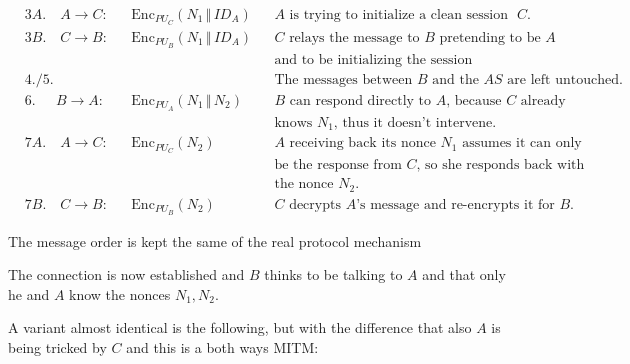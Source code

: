 \documentclass[oneside]{academica}
\begin{document}
\hspace{0.05\textwidth}
\begin{minipage}{0.95\textwidth}
  \vspace{-5pt}
  \begin{align*}
    & 3A. \quad A \rightarrow C: & & \text{Enc}_{PU_C} \left( N_1 \,\Vert\, ID_A \right) & & \text{$A$ is trying to initialize a clean session with $C$.} \\
    & 3B. \quad C \rightarrow B: & & \text{Enc}_{PU_B} \left( N_1 \,\Vert\, ID_A \right) & & \text{$C$ relays the message to $B$ pretending to be $A$} \\ & & & & & \text{and to be initializing the session exchange with him.} \\
    & 4. / 5. & & & & \text{The messages between $B$ and the $AS$ are left untouched.} \\
    & 6. \ \ \quad B \rightarrow A: & & \text{Enc}_{PU_A} \left( N_1 \,\Vert\, N_2 \right) & & \text{$B$ can respond directly to $A$, because $C$ already} \\ & & & & & \text{knows $N_1$, thus it doesn't intervene.} \\
    & 7A. \quad A \rightarrow C: & & \text{Enc}_{PU_C} \left( N_2 \right) & & \text{$A$ receiving back its nonce $N_1$ assumes it can only} \\ & & & & & \text{be the response from $C$, so she responds back with} \\ & & & & & \text{the nonce $N_2$.} \\
    & 7B. \quad C \rightarrow B: & & \text{Enc}_{PU_B} \left( N_2 \right) & & \text{$C$ decrypts $A$'s message and re-encrypts it for $B$.}
  \end{align*}
\end{minipage}

\vspace{5pt}
\begin{note}
  The message order is kept the same of the real protocol mechanism
\end{note}

\vspace{5pt}
The connection is now established and $B$ thinks to be talking to $A$ and that only he and $A$ know the nonces $N_1, N_2$.

\newpage

A variant almost identical is the following, but with the difference that also $A$ is being tricked by $C$ and this is a both ways MITM:
\end{document}
